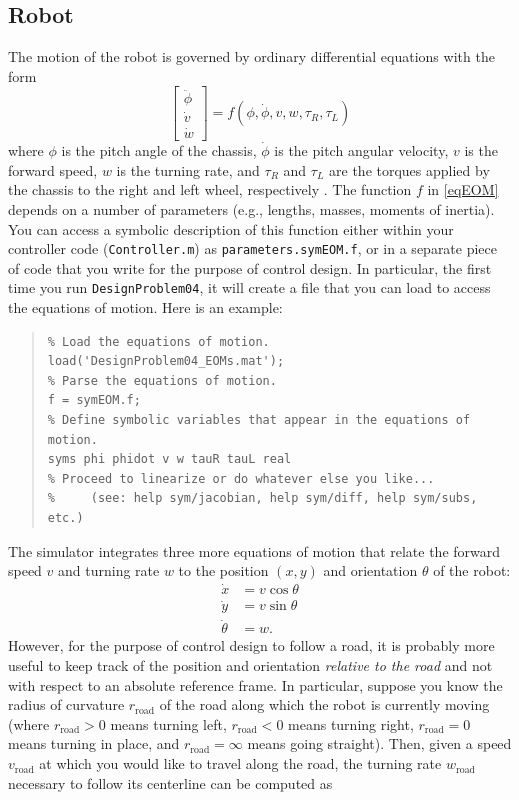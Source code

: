 \documentclass[12pt]{article}
\begin{document}
\subsection{Robot}
\label{secRobot}

The motion of the robot is governed by ordinary differential equations with the form
\begin{equation}
\label{eqEOM}
\begin{bmatrix} \ddot{\phi} \\ \dot{v} \\ \dot{w} \end{bmatrix} = f(\phi,\dot{\phi},v,w,\tau_{R},\tau_{L})
\end{equation}
where $\phi$ is the pitch angle of the chassis, $\dot{\phi}$ is the pitch angular velocity, $v$ is the forward speed, $w$ is the turning rate, and $\tau_{R}$ and $\tau_{L}$ are the torques applied by the chassis to the right and left wheel, respectively \cite{Mak2015,Tobias2014}. The function $f$ in \eqref{eqEOM} depends on a number of parameters (e.g., lengths, masses, moments of inertia). You can access a symbolic description of this function either within your controller code (\lstinline|Controller.m|) as \lstinline|parameters.symEOM.f|, or in a separate piece of code that you write for the purpose of control design. In particular, the first time you run \lstinline|DesignProblem04|, it will create a file that you can load to access the equations of motion. Here is an example:
\begin{quote}
\begin{lstlisting}
% Load the equations of motion.
load('DesignProblem04_EOMs.mat');
% Parse the equations of motion.
f = symEOM.f;
% Define symbolic variables that appear in the equations of motion.
syms phi phidot v w tauR tauL real
% Proceed to linearize or do whatever else you like...
%     (see: help sym/jacobian, help sym/diff, help sym/subs, etc.)
\end{lstlisting}
\end{quote}
The simulator integrates three more equations of motion that relate the forward speed $v$ and turning rate $w$ to the position $(x,y)$ and orientation $\theta$ of the robot:
\begin{align*}
\dot{x} &= v\cos\theta \\
\dot{y} &= v\sin\theta \\
\dot{\theta} &= w.
\end{align*}
However, for the purpose of control design to follow a road, it is probably more useful to keep track of the position and orientation {\em relative to the road} and not with respect to an absolute reference frame. In particular, suppose you know the radius of curvature $r_\text{road}$ of the road along which the robot is currently moving (where $r_\text{road}>0$ means turning left, $r_\text{road}<0$ means turning right, $r_\text{road}=0$ means turning in place, and $r_\text{road}=\infty$ means going straight). Then, given a speed $v_\text{road}$ at which you would like to travel along the road, the turning rate $w_\text{road}$ necessary to follow its centerline can be computed as
\end{document}
